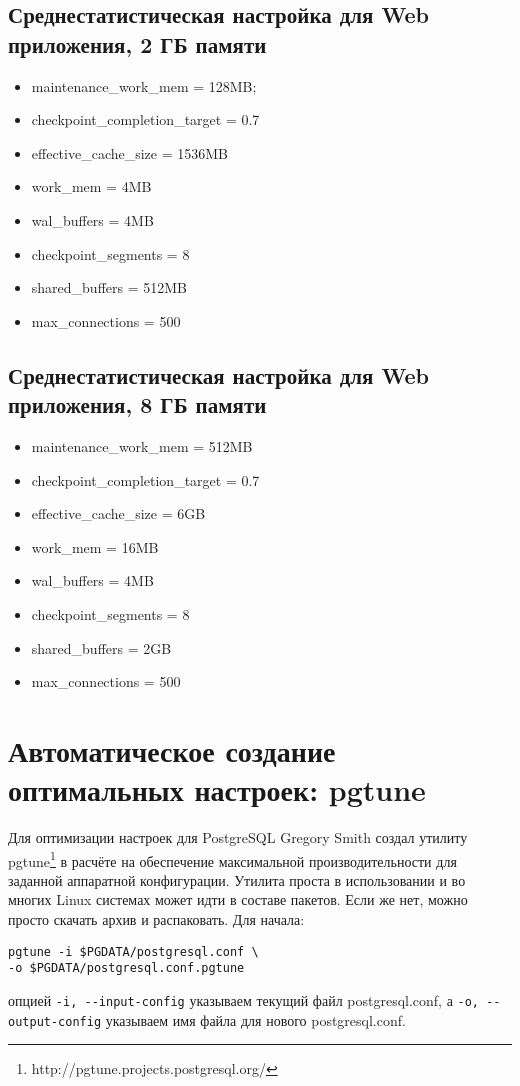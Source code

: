 \subsection{Среднестатистическая настройка для Web приложения, 2 ГБ памяти}

\begin{itemize}
\item maintenance\_work\_mem = 128MB;
\item checkpoint\_completion\_target = 0.7
\item effective\_cache\_size = 1536MB
\item work\_mem = 4MB
\item wal\_buffers = 4MB
\item checkpoint\_segments = 8
\item shared\_buffers = 512MB
\item max\_connections = 500
\end{itemize}

\subsection{Среднестатистическая настройка для Web приложения, 8 ГБ памяти}

\begin{itemize}
\item maintenance\_work\_mem = 512MB
\item checkpoint\_completion\_target = 0.7
\item effective\_cache\_size = 6GB
\item work\_mem = 16MB
\item wal\_buffers = 4MB
\item checkpoint\_segments = 8
\item shared\_buffers = 2GB
\item max\_connections = 500
\end{itemize}

\section{Автоматическое создание оптимальных настроек: pgtune}

Для оптимизации настроек для PostgreSQL Gregory Smith создал утилиту pgtune\footnote{http://pgtune.projects.postgresql.org/}
в расчёте на обеспечение максимальной производительности для заданной аппаратной конфигурации.
Утилита проста в использовании и во многих Linux системах может идти в составе пакетов.
Если же нет, можно просто скачать архив и распаковать.
Для начала:
\begin{lstlisting}[label=lst:p_settings1,caption=Pgtune]
pgtune -i $PGDATA/postgresql.conf \
-o $PGDATA/postgresql.conf.pgtune
\end{lstlisting}
опцией
\lstinline!-i, --input-config!
указываем текущий файл postgresql.conf,
а
\lstinline!-o, --output-config!
указываем имя файла для нового postgresql.conf.

